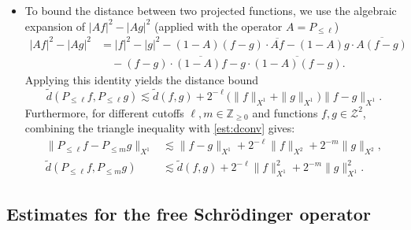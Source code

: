 \documentclass{amsart}
\numberwithin{equation}{section}
\newcommand{\Z}{\mathbb{Z}}
\begin{document}
\begin{itemize}
    \item  To bound the distance between two projected functions, we use the algebraic expansion of $|Af|^{2}-|Ag|^{2}$ (applied with the operator $A = P_{\leq \ell}$)
    \begin{equation}\label{id:sqdiff}
    \begin{aligned}
    |Af|^{2}-|Ag|^{2} &= |f|^2-|g|^2 -(1-A)(f-g)\cdot \overline{Af} - (1-A)g\cdot \overline{A (f-g)} \\
    &\quad - (f-g) \cdot \overline{(1-A)f} - g \cdot \overline{(1-A)(f-g)}.
    \end{aligned}
    \end{equation}
    Applying this identity yields the distance bound
    \begin{equation}\label{est:dkPl} 
    \widetilde{d}(P_{\leq \ell}f,P_{\leq \ell}g)\lesssim \widetilde{d}(f,g)+2^{-\ell}\big( \| f\|_{X^1}+\| g\|_{X^1}\big) \| f-g\|_{X^1}.
    \end{equation}
    Furthermore, for different cutoffs $\ell, m \in \Z_{\geq 0}$ and functions $f,g\in \mathcal{Z}^2$, combining the triangle inequality with \eqref{est:dconv} gives:
    \begin{equation} \label{est:d1PlPm}
    \begin{aligned}
    \| P_{\leq \ell}f-P_{\leq m}g\|_{X^1}&\lesssim \| f-g\|_{X^1}+2^{-\ell}\| f\|_{X^2}+2^{-m}\| g\|_{X^2}, \\
    \widetilde{d}(P_{\leq \ell}f,P_{\leq m}g)&\lesssim \widetilde{d}(f,g)+2^{-\ell}\| f\|_{X^1}^2+2^{-m}\| g\|_{X^1}^2.
    \end{aligned}
    \end{equation}
\end{itemize}




\subsection{Estimates for the free Schr\"odinger operator}
\label{subsec:Ut}
\end{document}
